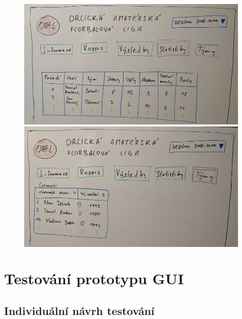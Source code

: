 \documentclass[11pt, a4paper, titlepage]{article}
\begin{document}
\begin{figure}[H]
\centering
    \begin{minipage}{.5\textwidth}
        \centering
        \includegraphics[width=.98\textwidth]{images/draft-05.png}
    \end{minipage}%
    \begin{minipage}{.5\textwidth}
        \centering
        \includegraphics[width=.98\textwidth]{images/draft-06.png}
    \end{minipage}
\end{figure}


\newpage

\section{Testování prototypu GUI}

\subsection{Individuální návrh testování}
\end{document}
